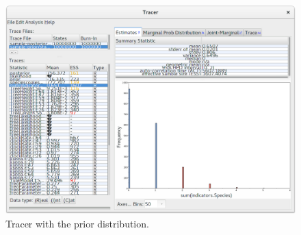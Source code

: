 \documentclass{article}
\begin{document}
\begin{figure}[htb!]
\centering
\includegraphics[width=\textwidth]{figures/tracer-prior.png}
\caption{Tracer with the prior distribution.}
\label{fig:tracerPrior}
\end{figure}

\clearpage



\end{document}
